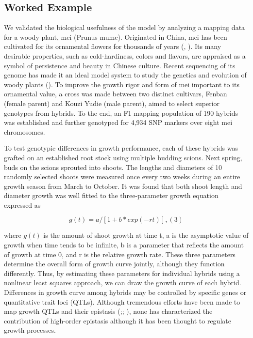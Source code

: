 \documentclass[]{book}
\theoremstyle{definition}
\theoremstyle{definition}
\theoremstyle{remark}
\begin{document}
\subsection{Worked Example}\label{worked-example}

We validated the biological usefulness of the model by analyzing a
mapping data for a woody plant, mei (Prunus mume). Originated in China,
mei has been cultivated for its ornamental flowers for thousands of
years (\cite{sun2013genome}, \cite{sun2014genetic}). Its many desirable
properties, such as cold-hardiness, colors and flavors, are appraised as
a symbol of persistence and beauty in Chinese culture. Recent sequencing
of its genome has made it an ideal model system to study the genetics
and evolution of woody plants (\cite{zhang2013epigenetic}). To improve
the growth rigor and form of mei important to its ornamental value, a
cross was made between two distinct cultivars, Fenban (female parent)
and Kouzi Yudie (male parent), aimed to select superior genotypes from
hybrids. To the end, an F1 mapping population of 190 hybrids was
established and further genotyped for 4,934 SNP markers over eight mei
chromosomes.

To test genotypic differences in growth performance, each of these
hybrids was grafted on an established root stock using multiple budding
scions. Next spring, buds on the scions sprouted into shoots. The
lengths and diameters of 10 randomly selected shoots were measured once
every two weeks during an entire growth season from March to October. It
was found that both shoot length and diameter growth was well fitted to
the three-parameter growth equation expressed as

\[g(t) = a/[1+b*exp(-rt)],                                                (3)\]

where \(g(t)\) is the amount of shoot growth at time t, a is the
asymptotic value of growth when time tends to be infinite, b is a
parameter that reflects the amount of growth at time 0, and r is the
relative growth rate. These three parameters determine the overall form
of growth curve jointly, although they function differently. Thus, by
estimating these parameters for individual hybrids using a nonlinear
least squares approach, we can draw the growth curve of each hybrid.
Differences in growth curve among hybrids may be controlled by specific
genes or quantitative trait loci (QTLs). Although tremendous efforts
have been made to map growth QTLs and their epistasis
(\cite{ma2002response};\cite{wu2006functional};
\cite{li2012estimation}), none has characterized the contribution of
high-order epistasis although it has been thought to regulate growth
processes.
\end{document}
